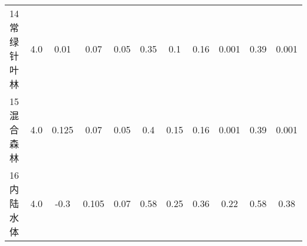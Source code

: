 \begin{landscape}
\begin{table}[htbp]
\begin{tabular}{@{}lcccccccccc@{}}
        14 常绿针叶林   & 4.0        & 0.01                                                                         & 0.07                                                                                                            & 0.05                                                                                                            & 0.35                                                                                                            & 0.1                                                                                                             & 0.16                                                                                                            & 0.001                                                                                                           & 0.39                                                                                                            & 0.001                                                                                                           \\
        15 混合森林    & 4.0        & 0.125                                                                        & 0.07                                                                                                            & 0.05                                                                                                            & 0.4                                                                                                             & 0.15                                                                                                            & 0.16                                                                                                            & 0.001                                                                                                           & 0.39                                                                                                            & 0.001                                                                                                           \\
        16 内陆水体    & 4.0        & -0.3                                                                         & 0.105                                                                                                           & 0.07                                                                                                            & 0.58                                                                                                            & 0.25                                                                                                            & 0.36                                                                                                            & 0.22                                                                                                            & 0.58                                                                                                            & 0.38                                                                                                            \\

\end{tabular}
\end{table}
\end{landscape}
